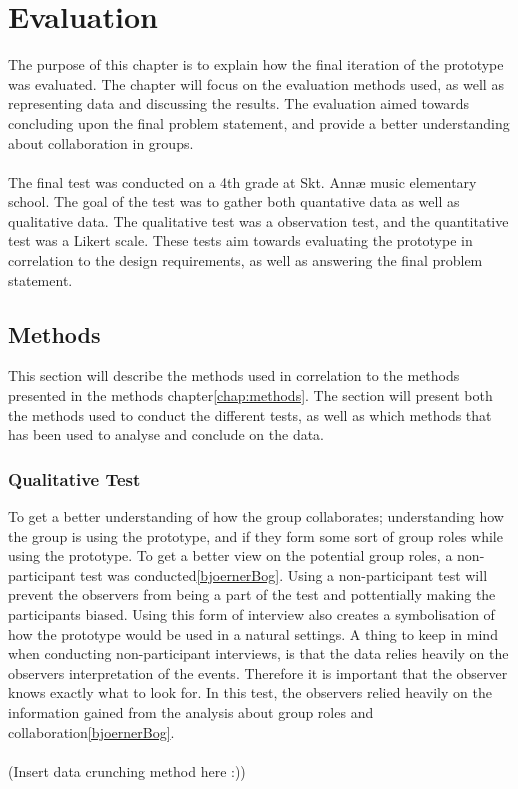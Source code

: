 \chapter{Evaluation}

The purpose of this chapter is to explain how the final iteration of the prototype was evaluated. The chapter will focus on the evaluation methods used, as well as representing data and discussing the results. The evaluation aimed towards concluding upon the final problem statement, and provide a better understanding about collaboration in groups.\\
\\
The final test was conducted on a 4th grade at Skt. Annæ music elementary school. The goal of the test was to gather both quantative data as well as qualitative data. The qualitative test was a observation test, and the quantitative test was a Likert scale. These tests aim towards evaluating the prototype in correlation to the design requirements, as well as answering the final problem statement.

\section{Methods}
This section will describe the methods used in correlation to the methods presented in the methods chapter\ref{chap:methods}. The section will present both the methods used to conduct the different tests, as well as which methods that has been used to analyse and conclude on the data. 

\subsection{Qualitative Test}
To get a better understanding of how the group collaborates; understanding how the group is using the prototype, and if they form some sort of group roles while using the prototype. To get a better view on the potential group roles, a non-participant test was conducted\ref{bjoernerBog}. Using a non-participant test will prevent the observers from being a part of the test and pottentially making the participants biased. Using this form of interview also creates a symbolisation of how the prototype would be used in a natural settings. A thing to keep in mind when conducting non-participant interviews, is that the data relies heavily on the observers interpretation of the events. Therefore it is important that the observer knows exactly what to look for. In this test, the observers relied heavily on the information gained from the analysis about group roles and collaboration\ref{bjoernerBog}.
\\\\
(Insert data crunching method here :))

